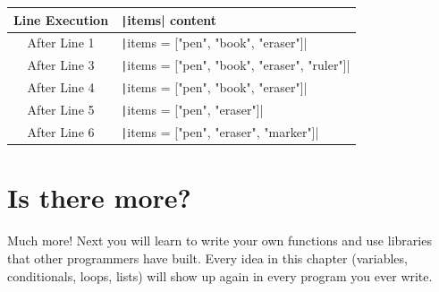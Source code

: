 \begin{Answer}[ref=lists1]
\begin{tabular}{|c|p{}|}
\hline
Line Execution & \texttt|items| content \\
\hline
After Line 1 & \texttt|items = ["pen", "book", "eraser"]| \\
\hline
After Line 3 & \texttt|items = ["pen", "book", "eraser", "ruler"]| \\
\hline
After Line 4 & \texttt|items = ["pen", "book", "eraser"]| \\
\hline
After Line 5 & \texttt|items = ["pen", "eraser"]| \\
\hline
After Line 6 & \texttt|items = ["pen", "eraser", "marker"]| \\
\hline
\end{tabular}
\end{Answer}

\section{Is there more?}
Much more! Next you will learn to write your own functions and use libraries that other programmers have built. Every idea in this chapter (variables, conditionals, loops, lists) will show up again in every program you ever write.